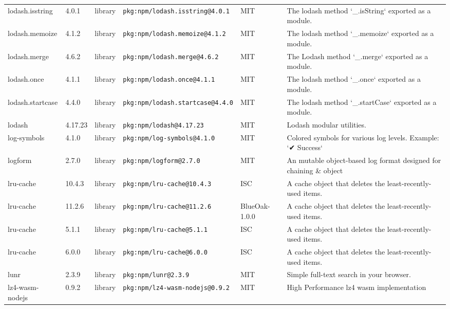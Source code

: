 \documentclass[11pt,a4paper]{article}
\begin{document}
\begin{longtable}{|p{4cm}|p{2cm}|p{1.6cm}|p{5cm}|p{1.5cm}|p{3.5cm}|}
\raggedright lodash.isstring & 4.0.1 & library & \small\texttt{pkg:npm/lodash.isstring@4.0.1} & MIT & \small The lodash method `\_.isString` exported as a module. \\
\raggedright lodash.memoize & 4.1.2 & library & \small\texttt{pkg:npm/lodash.memoize@4.1.2} & MIT & \small The lodash method `\_.memoize` exported as a module. \\
\raggedright lodash.merge & 4.6.2 & library & \small\texttt{pkg:npm/lodash.merge@4.6.2} & MIT & \small The Lodash method `\_.merge` exported as a module. \\
\raggedright lodash.once & 4.1.1 & library & \small\texttt{pkg:npm/lodash.once@4.1.1} & MIT & \small The lodash method `\_.once` exported as a module. \\
\raggedright lodash.startcase & 4.4.0 & library & \small\texttt{pkg:npm/lodash.startcase@4.4.0} & MIT & \small The lodash method `\_.startCase` exported as a module. \\
\raggedright lodash & 4.17.23 & library & \small\texttt{pkg:npm/lodash@4.17.23} & MIT & \small Lodash modular utilities. \\
\raggedright log-symbols & 4.1.0 & library & \small\texttt{pkg:npm/log-symbols@4.1.0} & MIT & \small Colored symbols for various log levels. Example: `✔︎ Success` \\
\raggedright logform & 2.7.0 & library & \small\texttt{pkg:npm/logform@2.7.0} & MIT & \small An mutable object-based log format designed for chaining \& object \\
\raggedright lru-cache & 10.4.3 & library & \small\texttt{pkg:npm/lru-cache@10.4.3} & ISC & \small A cache object that deletes the least-recently-used items. \\
\raggedright lru-cache & 11.2.6 & library & \small\texttt{pkg:npm/lru-cache@11.2.6} & BlueOak-1.0.0 & \small A cache object that deletes the least-recently-used items. \\
\raggedright lru-cache & 5.1.1 & library & \small\texttt{pkg:npm/lru-cache@5.1.1} & ISC & \small A cache object that deletes the least-recently-used items. \\
\raggedright lru-cache & 6.0.0 & library & \small\texttt{pkg:npm/lru-cache@6.0.0} & ISC & \small A cache object that deletes the least-recently-used items. \\
\raggedright lunr & 2.3.9 & library & \small\texttt{pkg:npm/lunr@2.3.9} & MIT & \small Simple full-text search in your browser. \\
\raggedright lz4-wasm-nodejs & 0.9.2 & library & \small\texttt{pkg:npm/lz4-wasm-nodejs@0.9.2} & MIT & \small High Performance lz4 wasm implementation \\

\end{longtable}
\end{document}
